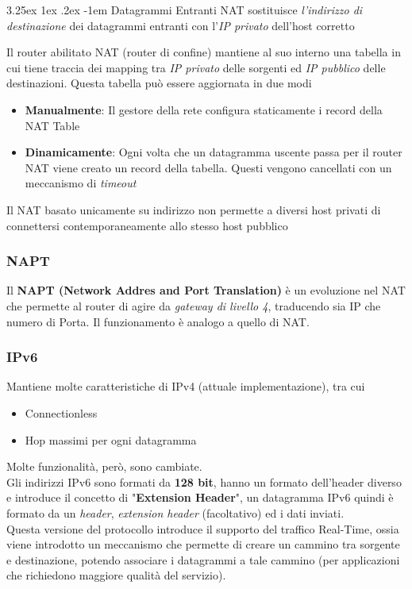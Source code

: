 \documentclass{article}
\makeatletter
\newcounter{subsubsubsection}[subsubsection]
\renewcommand\paragraph{\@startsection{paragraph}{5}{\z@}%
  {3.25ex \@plus1ex \@minus.2ex}%
  {-1em}%
  {\normalfont\normalsize\bfseries}}
\makeatother
\begin{document}
                \paragraph{Datagrammi Entranti}
                    NAT sostituisce \textit{l'indirizzo di destinazione} dei datagrammi entranti con l'\textit{IP privato} dell'host corretto

                    Il router abilitato NAT (router di confine) mantiene al suo interno una tabella in cui tiene traccia dei mapping tra \textit{IP privato} delle sorgenti ed \textit{IP pubblico} delle destinazioni. Questa tabella può essere aggiornata in due modi
                    \begin{itemize}
                        \item \textbf{Manualmente}: Il gestore della rete configura staticamente i record della NAT Table
                        \item \textbf{Dinamicamente}: Ogni volta che un datagramma uscente passa per il router NAT viene creato un record della tabella. Questi vengono cancellati con un meccanismo di \textit{timeout}
                    \end{itemize} 
                    Il NAT basato unicamente su indirizzo non permette a diversi host privati di connettersi contemporaneamente allo stesso host pubblico
                    
            \subsubsection{NAPT}
                Il \textbf{NAPT (Network Addres and Port Translation)} è un evoluzione nel NAT che permette al router di agire da \textit{gateway di livello 4}, traducendo sia IP che numero di Porta. Il funzionamento è analogo a quello di NAT.

            \subsubsection{IPv6}
                Mantiene molte caratteristiche di IPv4 (attuale implementazione), tra cui
                \begin{itemize}
                    \item Connectionless
                    \item Hop massimi per ogni datagramma
                \end{itemize}
                Molte funzionalità, però, sono cambiate.\\
                Gli indirizzi IPv6 sono formati da \textbf{128 bit}, hanno un formato dell'header diverso e introduce il concetto di "\textbf{Extension Header}", un datagramma IPv6 quindi è formato da un \textit{header}, \textit{extension header} (facoltativo) ed i dati inviati.\\
                Questa versione del protocollo introduce il supporto del traffico Real-Time, ossia viene introdotto un meccanismo che permette di creare un cammino tra sorgente e destinazione, potendo associare i datagrammi a tale cammino (per applicazioni che richiedono maggiore qualità del servizio).
\end{document}
